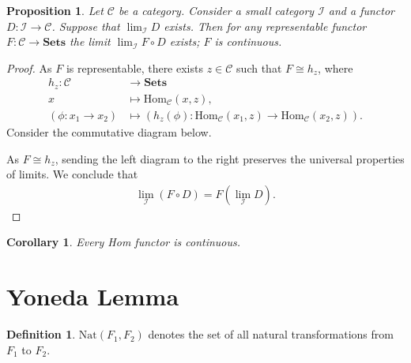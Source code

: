 \documentclass[12pt]{report}
\theoremstyle{plain}
\newtheorem{corollary}[theorem]{Corollary}
\newtheorem{proposition}[theorem]{Proposition}
\theoremstyle{remark}
\theoremstyle{definition}
\newtheorem{definition}[theorem]{Definition}
\begin{document}
\begin{proposition}
    Let $\mathcal{C}$ be a category. Consider a small category $\mathcal{I}$ and a functor $D : \mathcal{I}\rightarrow\mathcal{C}$. Suppose that $\lim_\mathcal{I} D$ exists. Then for any representable functor $F:\mathcal{C}\rightarrow\mathbf{Sets}$ the limit $\lim_\mathcal{I} F\circ D$ exists; $F$ is continuous.
\end{proposition}
\begin{proof}
    As $F$ is representable, there exists $z\in \mathcal{C}$ such that $F\cong h_z$, where
    \begin{align*}
        h_z : \mathcal{C} &\rightarrow \mathbf{Sets} \\
        x &\mapsto \mathrm{Hom}_\mathcal{C}(x,z), \\
        (\phi:x_1\rightarrow x_2) &\mapsto (h_z(\phi):\mathrm{Hom}_\mathcal{C}(x_1,z)\rightarrow \mathrm{Hom}_\mathcal{C}(x_2,z)).
    \end{align*}
    Consider the commutative diagram below.
    \begin{figure}[H]
        \centering
    \end{figure}
    \noindent As $F\cong h_z$, sending the left diagram to the right preserves the universal properties of limits. We conclude that
    \begin{align*}
        \lim_{\mathcal{I}}(F\circ D) = F\left(\lim_\mathcal{I} D\right).
    \end{align*}
\end{proof}

\begin{corollary}
    Every Hom functor is continuous.
\end{corollary}


\section{Yoneda Lemma}

\begin{definition}
    $\mathrm{Nat}(F_1,F_2)$ denotes the set of all natural transformations from $F_1$ to $F_2$.
\end{definition}
\end{document}
